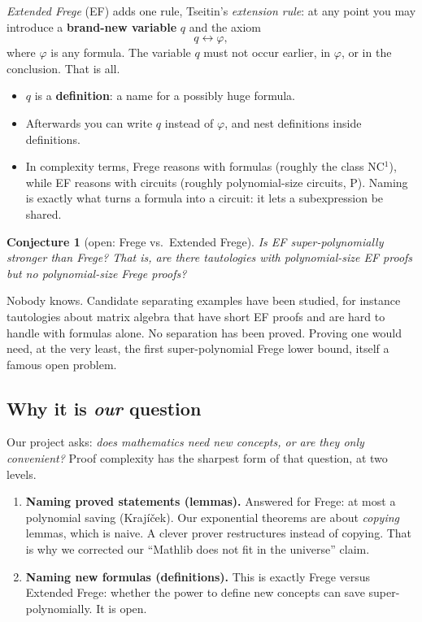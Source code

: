 \documentclass[11pt]{article}
\newtheorem*{conj}{Conjecture}
\begin{document}
\emph{Extended Frege} (EF) adds one rule, Tseitin's \emph{extension rule}: at any point you
may introduce a \textbf{brand-new variable} $q$ and the axiom
\[
q \leftrightarrow \varphi,
\]
where $\varphi$ is any formula. The variable $q$ must not occur earlier, in $\varphi$, or in
the conclusion. That is all.
\begin{itemize}
\item $q$ is a \textbf{definition}: a name for a possibly huge formula.
\item Afterwards you can write $q$ instead of $\varphi$, and nest definitions inside
  definitions.
\item In complexity terms, Frege reasons with formulas (roughly the class NC$^1$), while
  EF reasons with circuits (roughly polynomial-size circuits, P). Naming is exactly what
  turns a formula into a circuit: it lets a subexpression be shared.
\end{itemize}

\begin{conj}[open: Frege vs.\ Extended Frege]
Is EF super-polynomially stronger than Frege? That is, are there tautologies with
polynomial-size EF proofs but no polynomial-size Frege proofs?
\end{conj}

\noindent Nobody knows. Candidate separating examples have been studied, for instance
tautologies about matrix algebra that have short EF proofs and are hard to handle with
formulas alone. No separation has been proved. Proving one would need, at the very least,
the first super-polynomial Frege lower bound, itself a famous open problem.

\subsection{Why it is \emph{our} question}

Our project asks: \emph{does mathematics need new concepts, or are they only convenient?}
Proof complexity has the sharpest form of that question, at two levels.
\begin{enumerate}
\item \textbf{Naming proved statements (lemmas).} Answered for Frege: at most a polynomial
  saving (Kraj\'i\v{c}ek). Our exponential theorems are about \emph{copying} lemmas, which
  is naive. A clever prover restructures instead of copying. That is why we corrected our
  ``Mathlib does not fit in the universe'' claim.
\item \textbf{Naming new formulas (definitions).} This is exactly Frege versus Extended
  Frege: whether the power to define new concepts can save super-polynomially. It is
  open.
\end{enumerate}
\end{document}
